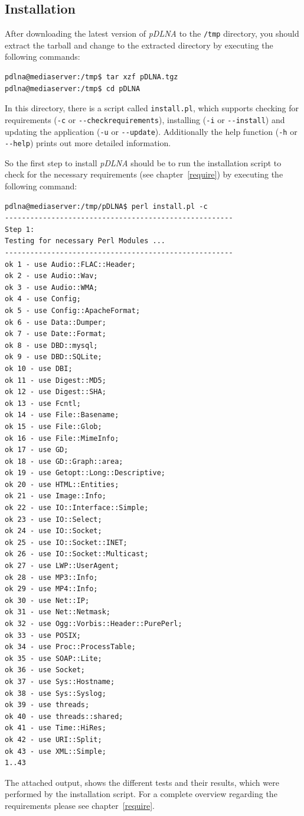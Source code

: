 \documentclass[a4paper,oneside,10pt]{report}
\begin{document}
\subsection{Installation}
\label{install-unix-latest-release-installation}

After downloading the latest version of {\em pDLNA} to the \verb|/tmp| directory, you should extract the tarball and change to the extracted directory by executing the following commands:
\begin{lstlisting}
pdlna@mediaserver:/tmp$ tar xzf pDLNA.tgz
pdlna@mediaserver:/tmp$ cd pDLNA
\end{lstlisting}

In this directory, there is a script called \verb|install.pl|, which supports checking for requirements (\verb|-c| or \verb|--checkrequirements|), installing (\verb|-i| or \verb|--install|) and updating the application (\verb|-u| or \verb|--update|). Additionally the help function (\verb|-h| or \verb|--help|) prints out more detailed information.

So the first step to install {\em pDLNA} should be to run the installation script to check for the necessary requirements (see chapter~\ref{require}) by executing the following command:
\begin{lstlisting}
pdlna@mediaserver:/tmp/pDLNA$ perl install.pl -c
------------------------------------------------------
Step 1:
Testing for necessary Perl Modules ...
------------------------------------------------------
ok 1 - use Audio::FLAC::Header;
ok 2 - use Audio::Wav;
ok 3 - use Audio::WMA;
ok 4 - use Config;
ok 5 - use Config::ApacheFormat;
ok 6 - use Data::Dumper;
ok 7 - use Date::Format;
ok 8 - use DBD::mysql;
ok 9 - use DBD::SQLite;
ok 10 - use DBI;
ok 11 - use Digest::MD5;
ok 12 - use Digest::SHA;
ok 13 - use Fcntl;
ok 14 - use File::Basename;
ok 15 - use File::Glob;
ok 16 - use File::MimeInfo;
ok 17 - use GD;
ok 18 - use GD::Graph::area;
ok 19 - use Getopt::Long::Descriptive;
ok 20 - use HTML::Entities;
ok 21 - use Image::Info;
ok 22 - use IO::Interface::Simple;
ok 23 - use IO::Select;
ok 24 - use IO::Socket;
ok 25 - use IO::Socket::INET;
ok 26 - use IO::Socket::Multicast;
ok 27 - use LWP::UserAgent;
ok 28 - use MP3::Info;
ok 29 - use MP4::Info;
ok 30 - use Net::IP;
ok 31 - use Net::Netmask;
ok 32 - use Ogg::Vorbis::Header::PurePerl;
ok 33 - use POSIX;
ok 34 - use Proc::ProcessTable;
ok 35 - use SOAP::Lite;
ok 36 - use Socket;
ok 37 - use Sys::Hostname;
ok 38 - use Sys::Syslog;
ok 39 - use threads;
ok 40 - use threads::shared;
ok 41 - use Time::HiRes;
ok 42 - use URI::Split;
ok 43 - use XML::Simple;
1..43
\end{lstlisting}
The attached output, shows the different tests and their results, which were performed by the installation script. For a complete overview regarding the requirements please see chapter~\ref{require}.
\end{document}
